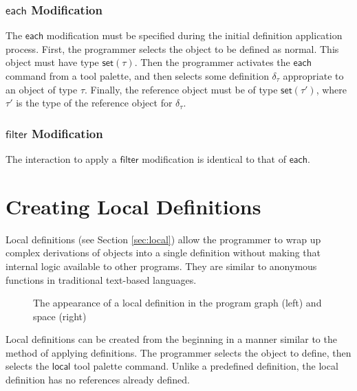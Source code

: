 \documentclass[twoside,11pt]{report}
\begin{document}
\subsubsection{$\mathsf{each}$ Modification}

The $\mathsf{each}$ modification must be specified during the initial definition application process.
First, the programmer selects the object to be defined as normal. 
This object must have type $\mathsf{set}(\tau)$.
Then the programmer activates the $\mathsf{each}$ command from a tool palette, and then selects some definition $\delta_\tau$ appropriate to an object of type $\tau$.
Finally, the reference object must be of type $\mathsf{set}(\tau')$, where $\tau'$ is the type of the reference object for $\delta_\tau$.

\subsubsection{$\mathsf{filter}$ Modification}

The interaction to apply a $\mathsf{filter}$ modification is identical to that of $\mathsf{each}.$

\section{Creating Local Definitions}
\label{sec:create-local}

Local definitions (see Section \ref{sec:local}) allow the programmer to wrap up complex derivations of objects into a single definition without making that internal logic available to other programs.
They are similar to anonymous functions in traditional text-based languages.

\begin{figure}[h]
  \centering
  \fbox{
    \begin{minipage}{3in}\hfill\vspace{2in}\end{minipage}
  }
  \fbox{
    \begin{minipage}{3in}\hfill\vspace{2in}\end{minipage}
  }
  \caption{The appearance of a local definition in the program graph (left) and space (right)}
  \label{fig:local}
\end{figure}

Local definitions can be created from the beginning in a manner similar to the method of applying definitions.
The programmer selects the object to define, then selects the $\mathsf{local}$ tool palette command. 
Unlike a predefined definition, the local definition has no references already defined.
\end{document}
